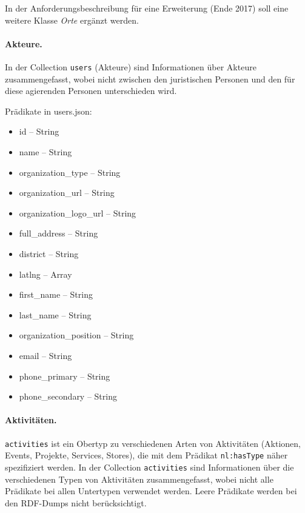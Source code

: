 \documentclass[a4paper,11pt]{article}
\begin{document}
In der Anforderungsbeschreibung für eine Erweiterung (Ende 2017) soll eine
weitere Klasse \emph{Orte} ergänzt werden.  

\paragraph{Akteure.}
In der Collection \texttt{users} (Akteure) sind Informationen über Akteure
zusammengefasst, wobei nicht zwischen den juristischen Personen und den für
diese agierenden Personen unterschieden wird. 

Prädikate in users.json:
\begin{itemize}\itemsep0pt
  \item id -- String
  \item name -- String
  \item organization\_type -- String
  \item organization\_url -- String
  \item organization\_logo\_url -- String
  \item full\_address -- String
  \item district -- String
  \item latlng -- Array
  \item first\_name -- String
  \item last\_name -- String
  \item organization\_position -- String
  \item email -- String
  \item phone\_primary -- String
  \item phone\_secondary -- String
\end{itemize}

\paragraph{Aktivitäten.}
\texttt{activities} ist ein Obertyp zu verschiedenen Arten von Aktivitäten
(Aktionen, Events, Projekte, Services, Stores), die mit dem Prädikat
\texttt{nl:hasType} näher spezifiziert werden.  In der Collection
\texttt{activities} sind Informationen über die verschiedenen Typen von
Aktivitäten zusammengefasst, wobei nicht alle Prädikate bei allen Untertypen
verwendet werden. Leere Prädikate werden bei den RDF-Dumps nicht
berücksichtigt.
\end{document}
